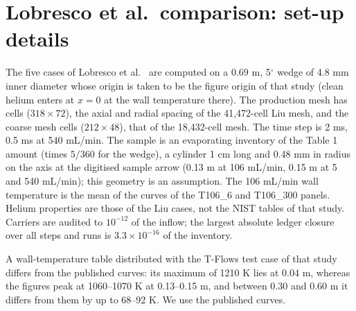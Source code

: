 \documentclass{article}
\begin{document}


\section{Lobresco et al.\ comparison: set-up details}
\label{sec:s-lobresco}
The five cases of Lobresco et al.\ \cite{Lobresco2026assessment} are
computed on a 0.69 m, 5$^\circ$ wedge of 4.8 mm inner diameter whose
origin is taken to be the figure origin of that study (clean helium
enters at $x=0$ at the wall temperature there). The production mesh has
\LobCellsProd{} cells ($318\times72$), the axial and radial spacing of
the 41,472-cell Liu mesh, and the coarse mesh \LobCellsCoarse{} cells
($212\times48$), that of the 18,432-cell mesh. The time step is 2 ms,
0.5 ms at 540 mL/min. The sample is an evaporating inventory of the
Table 1 amount (times $5/360$ for the wedge), a cylinder 1 cm long and
0.48 mm in radius on the axis at the digitised sample arrow (0.13 m at
106 mL/min, 0.15 m at 5 and 540 mL/min); this geometry is an
assumption. The 106 mL/min wall temperature is the mean of the curves
of the T106\_6 and T106\_300 panels. Helium properties are those of the
Liu cases, not the NIST tables of that study. Carriers are audited to
$10^{-12}$ of the inflow; the largest absolute ledger closure over all
steps and runs is $3.3\times10^{-16}$ of the inventory.

A wall-temperature table distributed with the T-Flows test case of that
study differs from the published curves: its maximum of 1210 K lies at
0.04 m, whereas the figures peak at 1060--1070 K at 0.13--0.15 m, and
between 0.30 and 0.60 m it differs from them by up to 68--92 K. We use
the published curves.
\end{document}
